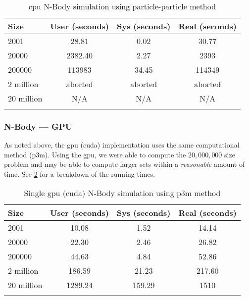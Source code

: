 \begin{table}[htb]
\centering{}
\begin{tabular}{lccc}
\toprule{}
\textbf{Size} & \textbf{User (seconds)} &
\textbf{Sys (seconds)} & \textbf{Real (seconds)} \\
\midrule{}
2001          & 28.81   & 0.02    & 30.77   \\
\midrule{}
20000         & 2382.40 & 2.27    & 2393    \\
\midrule{}
200000        & 113983  & 34.45   & 114349  \\
\midrule{}
2 million     & aborted & aborted & aborted \\
\midrule{}
20 million    & N/A     & N/A     & N/A     \\
\bottomrule{}
\end{tabular}
\caption{\gls{cpu} N-Body simulation using particle-particle method}
\label{tab:cpu_nbody}
\end{table}

\subsubsection{N-Body --- GPU}

As noted above, the \gls{gpu} (\gls{cuda}) implementation uses the same
computational method (\gls{p3m}). Using the \gls{gpu}, we were able to compute
the $ 20,000,000 $ size problem and may be able to compute larger sets within a
\emph{reasonable} amount of time. See \cref{tab:gpu_nbody} for a breakdown of
the running times.

\begin{table}[htb]
\centering{}
\begin{tabular}{lccc}
\toprule{}
\textbf{Size} & \textbf{User (seconds)} &
\textbf{Sys (seconds)} & \textbf{Real (seconds)} \\
\midrule{}
2001          & 10.08   & 1.52    & 14.14  \\
\midrule{}
20000         & 22.30   & 2.46    & 26.82  \\
\midrule{}
200000        & 44.63   & 4.84    & 52.86  \\
\midrule{}
2 million     & 186.59  & 21.23   & 217.60 \\
\midrule{}
20 million    & 1289.24 & 159.29  & 1510   \\
\bottomrule{}
\end{tabular}
\caption{Single \gls{gpu} (\gls{cuda}) N-Body simulation using \gls{p3m}
method}
\label{tab:gpu_nbody}
\end{table}


